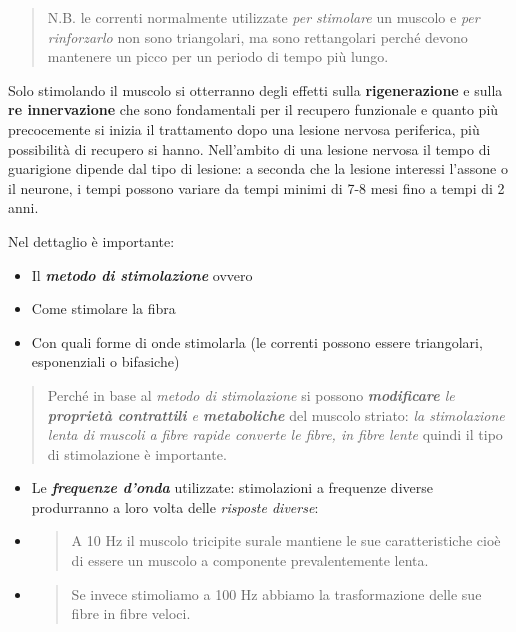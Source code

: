 \documentclass[]{article}
\begin{document}
\begin{quote}
N.B. le correnti normalmente utilizzate \emph{per stimolare} un muscolo
e \emph{per rinforzarlo} non sono triangolari, ma sono rettangolari
perché devono mantenere un picco per un periodo di tempo più lungo.
\end{quote}

Solo stimolando il muscolo si otterranno degli effetti sulla
\textbf{rigenerazione} e sulla \textbf{re innervazione} che sono
fondamentali per il recupero funzionale e quanto più precocemente si
inizia il trattamento dopo una lesione nervosa periferica, più
possibilità di recupero si hanno. Nell'ambito di una lesione nervosa il
tempo di guarigione dipende dal tipo di lesione: a seconda che la
lesione interessi l'assone o il neurone, i tempi possono variare da
tempi minimi di 7-8 mesi fino a tempi di 2 anni.

Nel dettaglio è importante:

\begin{itemize}
\item
  Il \textbf{\emph{metodo di stimolazione}} ovvero
\end{itemize}

\begin{itemize}
\item
  Come stimolare la fibra
\item
  Con quali forme di onde stimolarla (le correnti possono essere
  triangolari, esponenziali o bifasiche)
\end{itemize}

\begin{quote}
Perché in base al \emph{metodo di stimolazione} si possono
\emph{\textbf{modificare} le \textbf{proprietà contrattili} e
\textbf{metaboliche}} del muscolo striato: \emph{la stimolazione lenta
di muscoli a fibre rapide converte le fibre, in fibre lente} quindi il
tipo di stimolazione è importante.
\end{quote}

\begin{itemize}
\item
  Le \textbf{\emph{frequenze d'onda}} utilizzate: stimolazioni a
  frequenze diverse produrranno a loro volta delle \emph{risposte
  diverse}:
\end{itemize}

\begin{itemize}
\item
  \begin{quote}
  A 10 Hz il muscolo tricipite surale mantiene le sue caratteristiche
  cioè di essere un muscolo a componente prevalentemente lenta.
  \end{quote}
\item
  \begin{quote}
  Se invece stimoliamo a 100 Hz abbiamo la trasformazione delle sue
  fibre in fibre veloci.
  \end{quote}
\end{itemize}
\end{document}
